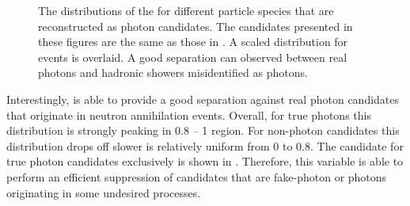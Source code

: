\begin{figure}[htbp!]
    \centering
    \caption{\label{fig:zmva_distribution} The distributions of the \ZMVA for different particle species that are reconstructed as photon candidates.
    The candidates presented in these figures are the same as those in .
    A scaled \ZMVA distribution for \BtoXsgamma events is overlaid.
    A good separation can observed between real photons and hadronic showers misidentified as photons.}
\end{figure}

Interestingly, \ZMVA is able to provide a good separation against real photon candidates that originate in neutron annihilation events.
Overall, for true \BtoXsgamma photons this distribution is strongly peaking in 0.8 -- 1 region.
For non-\BtoXsgamma photon candidates this distribution drops off slower is relatively uniform from 0 to 0.8.
The \ZMVA candidate for true photon candidates exclusively is shown in .
Therefore, this variable is able to perform an efficient suppression of candidates that are fake-photon or photons originating in some undesired processes.

